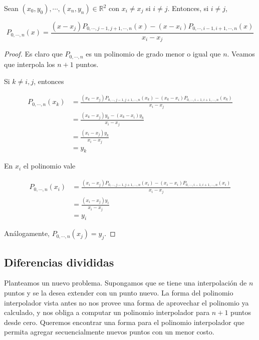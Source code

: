\begin{lema}
\label{lema:interp}
Sean $(x_0, y_0), \cdots, (x_n, y_n) \in \mathbb{R}^2$ con $x_i \neq x_j$ si $i \neq j$. Entonces, si $i \neq j$,

\[P_{0, \cdots, n}(x) = \frac{(x - x_j) P_{0, \cdots, j - 1, j + 1, \cdots, n}(x) - (x - x_i) P_{0, \cdots, i - 1, i + 1, \cdots, n}(x)}{x_i - x_j}\]

\begin{proof}
Es claro que $P_{0, \cdots, n}$ es un polinomio de grado menor o igual que $n$. Veamos que interpola los $n + 1$ puntos.

Si $k \neq i, j$, entonces

\begin{align*}
P_{0, \cdots, n}(x_k) &= \frac{(x_k - x_j) P_{0, \cdots, j - 1, j + 1, \cdots, n}(x_k) - (x_k - x_i) P_{0, \cdots, i - 1, i + 1, \cdots, n}(x_k)}{x_i - x_j}\\
&= \frac{(x_k - x_j) y_k - (x_k - x_i) y_k}{x_i - x_j}\\
&= \frac{(x_i - x_j) y_k}{x_i - x_j}\\
&= y_k
\end{align*}

En $x_i$ el polinomio vale

\begin{align*}
P_{0, \cdots, n}(x_i) &= \frac{(x_i - x_j) P_{0, \cdots, j - 1, j + 1, \cdots, n}(x_i) - (x_i - x_i) P_{0, \cdots, i - 1, i + 1, \cdots, n}(x_i)}{x_i - x_j}\\
&= \frac{(x_i - x_j) y_i}{x_i - x_j}\\
&= y_i
\end{align*}

Análogamente, $P_{0, \cdots, n}(x_j) = y_j$.

\end{proof}
\end{lema}

\subsection{Diferencias divididas}

Planteamos un nuevo problema. Supongamos que se tiene una interpolación de $n$ puntos y se la desea extender con un punto nuevo. La forma del polinomio interpolador vista antes no nos provee una forma de aprovechar el polinomio ya calculado, y nos obliga a computar un polinomio interpolador para $n + 1$ puntos desde cero. Queremos encontrar una forma para el polinomio interpolador que permita agregar secuencialmente nuevos puntos con un menor costo.

